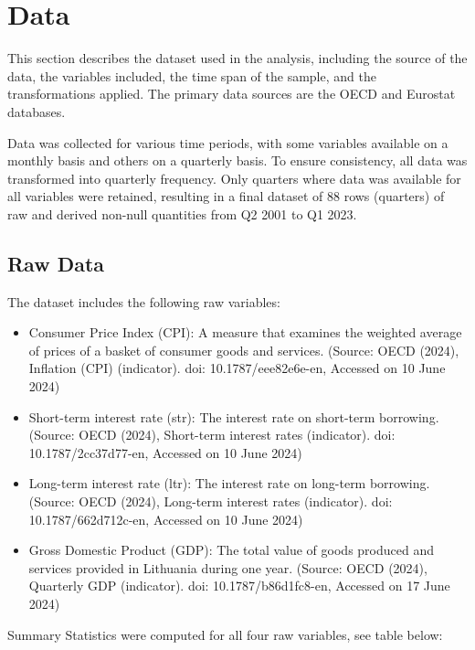 \documentclass[12pt]{article}
\begin{document}
\newpage

\section{Data}

This section describes the dataset used in the analysis, including the source of the data, the variables included, the time span of the sample, and the transformations applied. The primary data sources are the OECD and Eurostat databases.

Data was collected for various time periods, with some variables available on a monthly basis and others on a quarterly basis. To ensure consistency, all data was transformed into quarterly frequency. Only quarters where data was available for all variables were retained, resulting in a final dataset of 88 rows (quarters) of raw and derived non-null quantities from Q2 2001 to Q1 2023.

\subsection{Raw Data}

The dataset includes the following raw variables:

\begin{itemize}
    \item Consumer Price Index (CPI): A measure that examines the weighted average of prices of a basket of consumer goods and services. (Source: OECD (2024), Inflation (CPI) (indicator). doi: 10.1787/eee82e6e-en, Accessed on 10 June 2024)
    \item Short-term interest rate (str): The interest rate on short-term borrowing. (Source: OECD (2024), Short-term interest rates (indicator). doi: 10.1787/2cc37d77-en, Accessed on 10 June 2024)
    \item Long-term interest rate (ltr): The interest rate on long-term borrowing. (Source: OECD (2024), Long-term interest rates (indicator). doi: 10.1787/662d712c-en, Accessed on 10 June 2024)
    \item Gross Domestic Product (GDP): The total value of goods produced and services provided in Lithuania during one year. (Source: OECD (2024), Quarterly GDP (indicator). doi: 10.1787/b86d1fc8-en, Accessed on 17 June 2024)
\end{itemize}

Summary Statistics were computed for all four raw variables, see table below:
\end{document}
